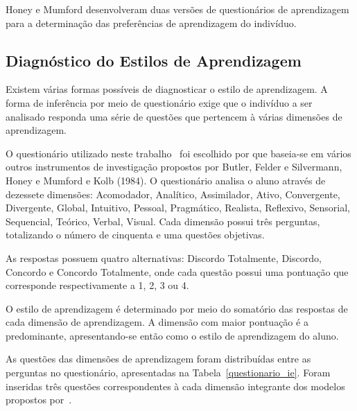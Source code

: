 Honey e Mumford desenvolveram duas versões de questionários de aprendizagem~\cite{honey2000} para a determinação das preferências de aprendizagem do indivíduo.

\subsection{Diagnóstico do Estilos de Aprendizagem}
Existem várias formas possíveis de diagnosticar o estilo de aprendizagem. A forma de inferência por meio de questionário exige que o indivíduo a ser analisado responda uma série de questões que pertencem à várias dimensões de aprendizagem.

O questionário utilizado neste trabalho~\cite{muhlbeier12} foi escolhido por que baseia-se em vários outros instrumentos de investigação propostos por Butler, Felder e Silvermann, Honey e Mumford e Kolb (1984). O questionário analisa o aluno através de dezessete dimensões: Acomodador, Analítico, Assimilador, Ativo, Convergente, Divergente, Global, Intuitivo, Pessoal, Pragmático, Realista, Reflexivo, Sensorial, Sequencial, Teórico, Verbal, Visual. Cada dimensão possui três perguntas, totalizando o número de cinquenta e uma questões objetivas.

As respostas possuem quatro alternativas: Discordo Totalmente, Discordo, Concordo e Concordo Totalmente, onde cada questão possui uma pontuação que corresponde respectivamente a 1, 2, 3 ou 4.

O estilo de aprendizagem é determinado por meio do somatório das respostas de cada dimensão de aprendizagem. A dimensão com maior pontuação é a predominante, apresentando-se então como o estilo de aprendizagem do aluno. 

As questões das dimensões de aprendizagem foram distribuídas entre as perguntas no questionário, apresentadas na Tabela~\ref{questionario_ie}. Foram inseridas três questões correspondentes à cada dimensão integrante dos modelos propostos por~\cite{muhlbeier12}.

